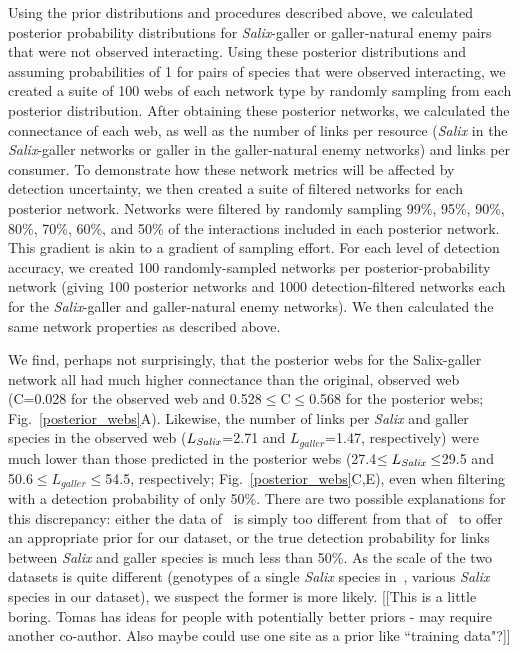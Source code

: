 \documentclass[12pt]{article}
\begin{document}
\begin{spacing}{2.0}
    Using the prior distributions and procedures described above, we calculated posterior probability distributions for \emph{Salix}-galler or galler-natural enemy pairs that were not observed interacting. Using these posterior distributions and assuming probabilities of 1 for pairs of species that were observed interacting, we created a suite of 100 webs of each network type by randomly sampling from each posterior distribution. After obtaining these posterior networks, we calculated the connectance of each web, as well as the number of links per resource (\emph{Salix} in the \emph{Salix}-galler networks or galler in the galler-natural enemy networks) and links per consumer. To demonstrate how these network metrics will be affected by detection uncertainty, we then created a suite of filtered networks for each posterior network. Networks were filtered by randomly sampling 99\%, 95\%, 90\%, 80\%, 70\%, 60\%, and 50\% of the interactions included in each posterior network. This gradient is akin to a gradient of sampling effort. For each level of detection accuracy, we created 100 randomly-sampled networks per posterior-probability network (giving 100 posterior networks and 1000 detection-filtered networks each for the \emph{Salix}-galler and galler-natural enemy networks). We then calculated the same network properties as described above.


    We find, perhaps not surprisingly, that the posterior webs for the Salix-galler network all had much higher connectance than the original, observed web (C=0.028 for the observed web and 0.528$\leq$C$\leq$0.568 for the posterior webs; Fig.~\ref{posterior_webs}A). Likewise, the number of links per \emph{Salix} and galler species in the observed web ($L_{\emph{Salix}}$=2.71 and $L_{galler}$=1.47, respectively) were much lower than those predicted in the posterior webs (27.4$\leq L_{\emph{Salix}} \leq$29.5 and 50.6$\leq L_{galler} \leq $54.5, respectively; Fig.~\ref{posterior_webs}C,E), even when filtering with a detection probability of only 50\%. There are two possible explanations for this discrepancy: either the data of~\citet{Barbour2016} is simply too different from that of~\citet{Kopelke2017} to offer an appropriate prior for our dataset, or the true detection probability for links between \emph{Salix} and galler species is much less than 50\%. As the scale of the two datasets is quite different (genotypes of a single \emph{Salix} species in~\citet{Barbour2016}, various \emph{Salix} species in our dataset), we suspect the former is more likely.
    [[This is a little boring. Tomas has ideas for people with potentially better priors - may require another co-author. Also maybe could use one site as a prior like ``training data"?]]



\end{spacing}
\end{document}
